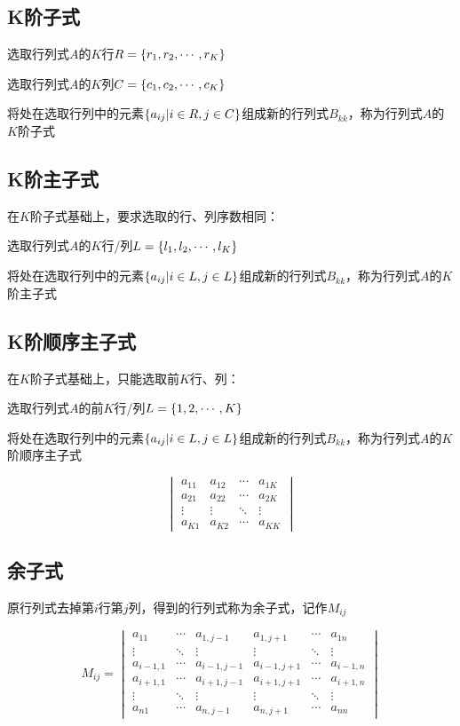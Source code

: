 \documentclass{article}
\begin{document}
\subsection{K阶子式}

选取行列式$A$的$K$行$R=\left\{r_1,r_2,\cdots,r_K\right\}$

选取行列式$A$的$K$列$C=\left\{c_1,c_2,\cdots,c_K\right\}$

将处在选取行列中的元素$\left\{a_{ij}|i\in R,j\in C\right\}$组成新的行列式$B_{kk}$，称为行列式$A$的$K$阶子式

\subsection{K阶主子式}

在$K$阶子式基础上，要求选取的行、列序数相同：

选取行列式$A$的$K$行/列$L=\left\{l_1,l_2,\cdots,l_K\right\}$

将处在选取行列中的元素$\left\{a_{ij}|i\in L,j\in L\right\}$组成新的行列式$B_{kk}$，称为行列式$A$的$K$阶主子式

\subsection{K阶顺序主子式}

在$K$阶子式基础上，只能选取前$K$行、列：

选取行列式$A$的前$K$行/列$L=\left\{1,2,\cdots,K\right\}$

将处在选取行列中的元素$\left\{a_{ij}|i\in L,j\in L\right\}$组成新的行列式$B_{kk}$，称为行列式$A$的$K$阶顺序主子式

\[\begin{vmatrix}
        a_{11} & a_{12} & \cdots & a_{1K} \\
        a_{21} & a_{22} & \cdots & a_{2K} \\
        \vdots & \vdots & \ddots & \vdots \\
        a_{K1} & a_{K2} & \cdots & a_{KK}
    \end{vmatrix}\]

\subsection{余子式}

原行列式去掉第$i$行第$j$列，得到的行列式称为余子式，记作$M_{ij}$

\[M_{ij}=\begin{vmatrix}
        a_{11}    & \cdots & a_{1,j-1}   & a_{1,j+1}   & \cdots & a_{1n}    \\
        \vdots    & \ddots & \vdots      & \vdots      & \ddots & \vdots    \\
        a_{i-1,1} & \cdots & a_{i-1,j-1} & a_{i-1,j+1} & \cdots & a_{i-1,n} \\
        a_{i+1,1} & \cdots & a_{i+1,j-1} & a_{i+1,j+1} & \cdots & a_{i+1,n} \\
        \vdots    & \ddots & \vdots      & \vdots      & \ddots & \vdots    \\
        a_{n1}    & \cdots & a_{n,j-1}   & a_{n,j+1}   & \cdots & a_{nn}
    \end{vmatrix}\]
\end{document}

